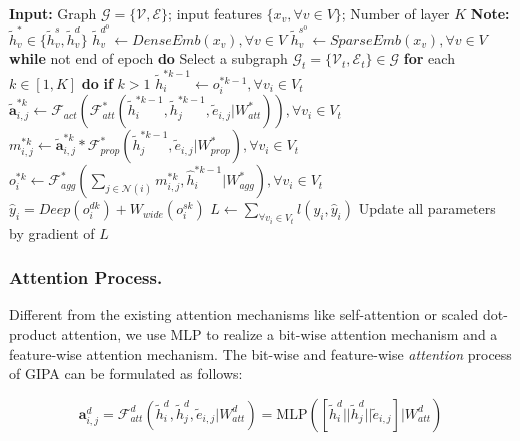 \documentclass[runningheads]{llncs}
\newcommand{\model}{GIPA\xspace}
\begin{document}
\begin{algorithm}[t]
\caption{The optimization strategy of GIPA}
\label{alg::algorithm1}
\begin{algorithmic}[1]
\State \textbf{Input:} Graph $\mathcal{G}=\{\mathcal{V}, \mathcal{E}\}$; input features $\{x_{v}, \forall v \in V\}$; Number of layer $K$
\State \textbf{Note:} $\tilde{h}_{v}^* \in \{\tilde{h}_{v}^s,   \tilde{h}_{v}^d\}$
\State $\tilde{h}_v^{d^0} \leftarrow DenseEmb(x_{v}), \forall v \in V$  \State $\tilde{h}_v^{s^0} \leftarrow SparseEmb(x_{v}), \forall v \in V$
\State\textbf{while} not end of epoch \textbf{do}
\State \qquad Select a subgraph $\mathcal{G}_t=\{\mathcal{V}_t, \mathcal{E}_t\} \in \mathcal{G}$
\State \qquad \textbf{for} each $k \in [1, K]$ \textbf{do}
\State \qquad \qquad \textbf{if} $k > 1$
\State \qquad \qquad \qquad $\tilde{h}_i^{*k-1} \leftarrow o_{i}^{*k-1}, \forall v_i \in V_t$
\State \qquad \qquad $\tilde{\bm{a}}_{i, j}^{*k} \leftarrow \mathcal{F}_{act}(\mathcal{F}_{att}^*(\tilde{h}_i^{*k-1}, \tilde{h}_j^{*k-1}, \tilde{e}_{i, j}|W_{att}^*)), \forall v_i \in V_t$
\State \qquad \qquad $m_{i, j}^{*k} \leftarrow \tilde{\bm{a}}_{i, j}^{*k} * \mathcal{F}_{prop}^*(\tilde{h}_j^{*k-1}, \tilde{e}_{i,j}|W_{prop}^*), \forall v_i \in V_t$
\State \qquad \qquad $o_{i}^{*k} \leftarrow \mathcal{F}_{agg}^*(\sum_{j\in\mathcal{N}(i)}m_{i, j}^{*k}, \hat{h}_i^{*k-1} | W_{agg}^*), \forall v_i \in V_t$
\State \qquad $\hat{y}_i = Deep(o_{i}^{dk})+ W_{wide}(o_{i}^{sk})$
\State \qquad $L \leftarrow \sum_{\forall v_i \in V_t}l(y_i, \hat{y}_i)$
\State \qquad Update all parameters by gradient of $L$
\end{algorithmic}
\end{algorithm}

\subsubsection{Attention Process.}
Different from the existing attention mechanisms like self-attention or scaled dot-product attention, we use MLP to realize a bit-wise attention mechanism and a feature-wise attention mechanism.
The bit-wise  and feature-wise \textit{attention} process of \model can be formulated as follows:

\begin{equation}
\label{eq:att1}
\bm{a}_{i, j}^d = \mathcal{F}_{att}^d(\tilde{h}_i^d, \tilde{h}_j^d, \tilde{e}_{i, j}|W_{att}^d) = \text{MLP}([\tilde{h}_i^d || \tilde{h}_j^d || \tilde{e}_{i, j}]|W_{att}^d)
\end{equation}
\end{document}
